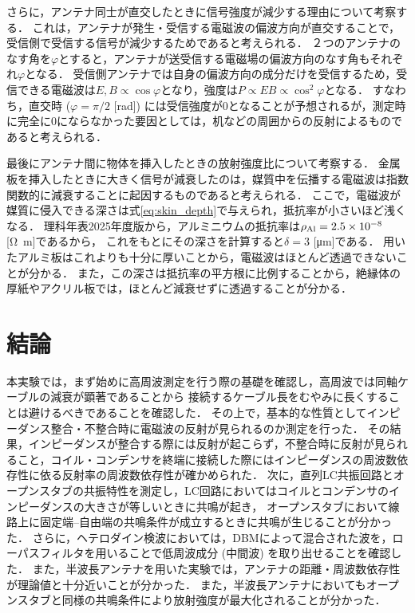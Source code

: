 \documentclass[uplatex,dvipdfmx,a4j,12pt]{jsarticle}
\begin{document}
さらに，アンテナ同士が直交したときに信号強度が減少する理由について考察する．
これは，アンテナが発生・受信する電磁波の偏波方向が直交することで，受信側で受信する信号が減少するためであると考えられる．
２つのアンテナのなす角を$\varphi$とすると，アンテナが送受信する電磁場の偏波方向のなす角もそれぞれ$\varphi$となる．
受信側アンテナでは自身の偏波方向の成分だけを受信するため，受信できる電磁波は$E, B \propto \cos \varphi$となり，強度は$P \propto E B \propto \cos^2 \varphi$となる．
すなわち，直交時 ($\varphi = \pi/2$ [rad]) には受信強度が0となることが予想されるが，測定時に完全に0にならなかった要因としては，机などの周囲からの反射によるものであると考えられる．

最後にアンテナ間に物体を挿入したときの放射強度比について考察する．
金属板を挿入したときに大きく信号が減衰したのは，媒質中を伝播する電磁波は指数関数的に減衰することに起因するものであると考えられる．
ここで，電磁波が媒質に侵入できる深さは式\eqref{eq:skin_depth}で与えられ，抵抗率が小さいほど浅くなる．
理科年表2025年度版から，アルミニウムの抵抗率は$\rho_{\ce{Al}} = 2.5 \times 10^{-8}$ [\si{\ohm \meter}]であるから，
これをもとにその深さを計算すると$\delta = 3$ [\si{\micro \meter}]である．
用いたアルミ板はこれよりも十分に厚いことから，電磁波はほとんど透過できないことが分かる．
また，この深さは抵抗率の平方根に比例することから，絶縁体の厚紙やアクリル板では，ほとんど減衰せずに透過することが分かる．

\section{結論}

本実験では，まず始めに高周波測定を行う際の基礎を確認し，高周波では同軸ケーブルの減衰が顕著であることから
接続するケーブル長をむやみに長くすることは避けるべきであることを確認した．
その上で，基本的な性質としてインピーダンス整合・不整合時に電磁波の反射が見られるのか測定を行った．
その結果，インピーダンスが整合する際には反射が起こらず，不整合時に反射が見られること，コイル・コンデンサを終端に接続した際にはインピーダンスの周波数依存性に依る反射率の周波数依存性が確かめられた．
次に，直列LC共振回路とオープンスタブの共振特性を測定し，LC回路においてはコイルとコンデンサのインピーダンスの大きさが等しいときに共鳴が起き，
オープンスタブにおいて線路上に固定端--自由端の共鳴条件が成立するときに共鳴が生じることが分かった．
さらに，ヘテロダイン検波においては，DBMによって混合された波を，ローパスフィルタを用いることで低周波成分 (中間波) を取り出せることを確認した．
また，半波長アンテナを用いた実験では，アンテナの距離・周波数依存性が理論値と十分近いことが分かった．
また，半波長アンテナにおいてもオープンスタブと同様の共鳴条件により放射強度が最大化されることが分かった．
\end{document}
